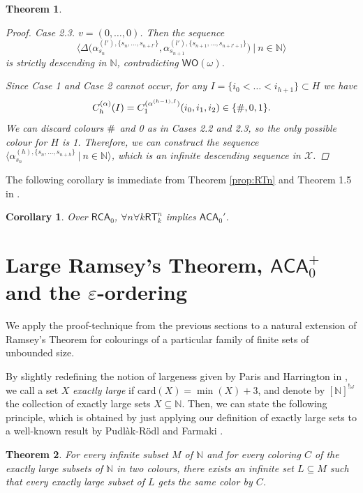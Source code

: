 \documentclass{amsart}
\newcommand\Nat{\mathbb{N}}
\newcommand\RCA{\mathsf{RCA}}
\newcommand\ACA{\mathsf{ACA}}
\newcommand\RT{\mathsf{RT}}
\newcommand\WO{\mathsf{WO}}
\newcommand{\card}{\textrm{card}}
\newcommand{\LoX}{\mathcal{X}}
\newcommand\additionalsymbol{\text{\small{\#}}}
\newtheorem{theorem}{Theorem}
\newtheorem{corollary}{Corollary}
\begin{document}
\begin{theorem}
\begin{proof}
\smallskip
 
\emph{Case 2.3.} $v = (0, \ldots, 0)$. Then the sequence $$
\big\langle \Delta\big(\alpha^{(l'),\{s_n,\ldots,s_{n+l'}\}}_{s_n}, \alpha^{(l'),\{s_{n+1},\ldots,s_{n+l'+1}\}}_{s_{n+1}}\big) \ \big|\ n \in \Nat \big\rangle
$$
is strictly descending in $\Nat$, contradicting $\WO(\omega)$.

\smallskip
 
Since Case 1 and Case 2 cannot occur, for any $I = \{i_0 < \ldots < i_{h+1}\} \subset H$ we have 
$$C_h^{(\alpha)}(I) = C_1^{(\alpha^{(h-1),I})}(i_0, i_1, i_2) \in \{\additionalsymbol, 0,1\}.$$ 
We can discard colours $\additionalsymbol$ and 0 as in Cases 2.2 and 2.3, so the only possible colour for $H$ is 1.
Therefore, we can construct the sequence $\big\langle \alpha^{(h),\{s_n,\ldots,s_{n+h}\}}_{s_n} \ |\ n \in \Nat \big\rangle$, which is an infinite descending sequence in $\LoX$.
\end{proof}
\end{theorem}

The following corollary is immediate from Theorem \ref{prop:RTn} and Theorem 1.5 in \cite{Mar-Mon:11}. 

\begin{corollary}
Over $\RCA_0$, $\forall n\forall k\RT^n_k$ implies $\ACA_0'$.
\end{corollary}


\section{Large Ramsey's Theorem, $\ACA_0^+$ and the $\varepsilon$-ordering}

We apply the proof-technique from the previous sections to a natural extension of Ramsey's Theorem 
for colourings of a particular family of finite sets of unbounded size. 

By slightly redefining the notion of largeness given by Paris and Harrington in \cite{Har-Par:77}, we call a set $X$ {\em exactly large} if $\card(X) = \min(X)+3$, and denote by $[\Nat]^{!\omega}$ the collection of exactly large sets $X \subseteq \Nat$.
Then, we can state the following principle, which is obtained by just applying our definition of exactly large sets to a well-known result by Pudl\`ak-R\"odl \cite{Pud-Rod:82} and Farmaki \cite{Far-Neg:08}.

\begin{theorem} \label{thm:rtomega}
For every infinite subset $M$ of $\Nat$ and 
for every coloring $C$ of the exactly large 
subsets of $\Nat$ in two colours, there exists an infinite 
set $L\subseteq M$ such that every exactly large subset
of $L$ gets the same color by $C$.
\end{theorem}
\end{document}
